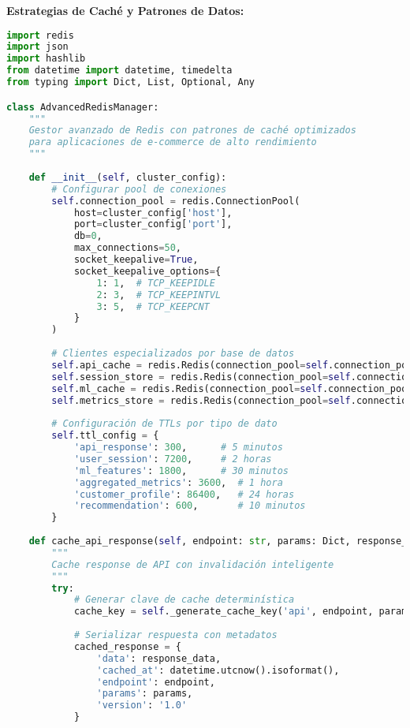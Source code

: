 \textbf{Estrategias de Caché y Patrones de Datos:}

\begin{lstlisting}[language=python, caption=Implementación de Patrones de Caché Avanzados, label=lst:redis_patterns]
import redis
import json
import hashlib
from datetime import datetime, timedelta
from typing import Dict, List, Optional, Any

class AdvancedRedisManager:
    """
    Gestor avanzado de Redis con patrones de caché optimizados
    para aplicaciones de e-commerce de alto rendimiento
    """
    
    def __init__(self, cluster_config):
        # Configurar pool de conexiones
        self.connection_pool = redis.ConnectionPool(
            host=cluster_config['host'],
            port=cluster_config['port'],
            db=0,
            max_connections=50,
            socket_keepalive=True,
            socket_keepalive_options={
                1: 1,  # TCP_KEEPIDLE
                2: 3,  # TCP_KEEPINTVL  
                3: 5,  # TCP_KEEPCNT
            }
        )
        
        # Clientes especializados por base de datos
        self.api_cache = redis.Redis(connection_pool=self.connection_pool, db=0)
        self.session_store = redis.Redis(connection_pool=self.connection_pool, db=1)
        self.ml_cache = redis.Redis(connection_pool=self.connection_pool, db=2)
        self.metrics_store = redis.Redis(connection_pool=self.connection_pool, db=3)
        
        # Configuración de TTLs por tipo de dato
        self.ttl_config = {
            'api_response': 300,      # 5 minutos
            'user_session': 7200,     # 2 horas
            'ml_features': 1800,      # 30 minutos
            'aggregated_metrics': 3600,  # 1 hora
            'customer_profile': 86400,   # 24 horas
            'recommendation': 600,       # 10 minutos
        }
    
    def cache_api_response(self, endpoint: str, params: Dict, response_data: Any) -> str:
        """
        Cache response de API con invalidación inteligente
        """
        try:
            # Generar clave de cache determinística
            cache_key = self._generate_cache_key('api', endpoint, params)
            
            # Serializar respuesta con metadatos
            cached_response = {
                'data': response_data,
                'cached_at': datetime.utcnow().isoformat(),
                'endpoint': endpoint,
                'params': params,
                'version': '1.0'
            }
            

\end{lstlisting}
